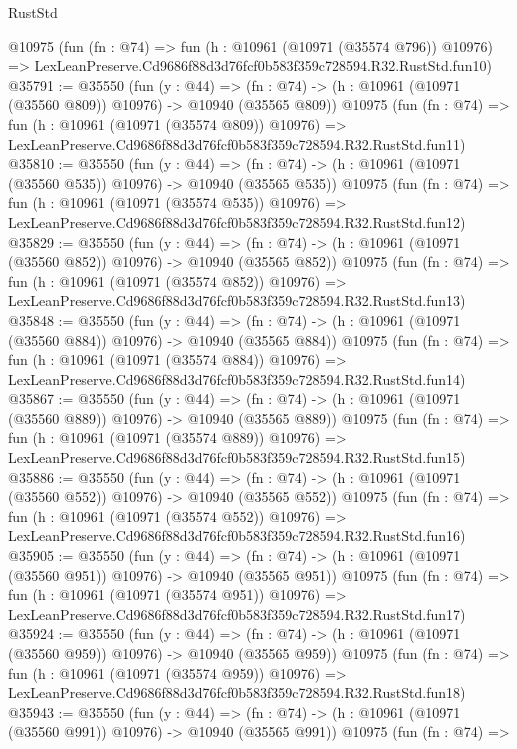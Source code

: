 \begin{lexlean}{RustStd}
\begin{coremodule}
    @10975
    (fun (fn : @74) =>
    fun (h : @10961 (@10971 (@35574 @796)) @10976) =>
    LexLeanPreserve.Cd9686f88d3d76fcf0b583f359c728594.R32.RustStd.fun10)
@35791 := @35550
    (fun (y : @44) =>
    (fn : @74) -> (h : @10961 (@10971 (@35560 @809)) @10976) -> @10940 (@35565 @809))
    @10975
    (fun (fn : @74) =>
    fun (h : @10961 (@10971 (@35574 @809)) @10976) =>
    LexLeanPreserve.Cd9686f88d3d76fcf0b583f359c728594.R32.RustStd.fun11)
@35810 := @35550
    (fun (y : @44) =>
    (fn : @74) -> (h : @10961 (@10971 (@35560 @535)) @10976) -> @10940 (@35565 @535))
    @10975
    (fun (fn : @74) =>
    fun (h : @10961 (@10971 (@35574 @535)) @10976) =>
    LexLeanPreserve.Cd9686f88d3d76fcf0b583f359c728594.R32.RustStd.fun12)
@35829 := @35550
    (fun (y : @44) =>
    (fn : @74) -> (h : @10961 (@10971 (@35560 @852)) @10976) -> @10940 (@35565 @852))
    @10975
    (fun (fn : @74) =>
    fun (h : @10961 (@10971 (@35574 @852)) @10976) =>
    LexLeanPreserve.Cd9686f88d3d76fcf0b583f359c728594.R32.RustStd.fun13)
@35848 := @35550
    (fun (y : @44) =>
    (fn : @74) -> (h : @10961 (@10971 (@35560 @884)) @10976) -> @10940 (@35565 @884))
    @10975
    (fun (fn : @74) =>
    fun (h : @10961 (@10971 (@35574 @884)) @10976) =>
    LexLeanPreserve.Cd9686f88d3d76fcf0b583f359c728594.R32.RustStd.fun14)
@35867 := @35550
    (fun (y : @44) =>
    (fn : @74) -> (h : @10961 (@10971 (@35560 @889)) @10976) -> @10940 (@35565 @889))
    @10975
    (fun (fn : @74) =>
    fun (h : @10961 (@10971 (@35574 @889)) @10976) =>
    LexLeanPreserve.Cd9686f88d3d76fcf0b583f359c728594.R32.RustStd.fun15)
@35886 := @35550
    (fun (y : @44) =>
    (fn : @74) -> (h : @10961 (@10971 (@35560 @552)) @10976) -> @10940 (@35565 @552))
    @10975
    (fun (fn : @74) =>
    fun (h : @10961 (@10971 (@35574 @552)) @10976) =>
    LexLeanPreserve.Cd9686f88d3d76fcf0b583f359c728594.R32.RustStd.fun16)
@35905 := @35550
    (fun (y : @44) =>
    (fn : @74) -> (h : @10961 (@10971 (@35560 @951)) @10976) -> @10940 (@35565 @951))
    @10975
    (fun (fn : @74) =>
    fun (h : @10961 (@10971 (@35574 @951)) @10976) =>
    LexLeanPreserve.Cd9686f88d3d76fcf0b583f359c728594.R32.RustStd.fun17)
@35924 := @35550
    (fun (y : @44) =>
    (fn : @74) -> (h : @10961 (@10971 (@35560 @959)) @10976) -> @10940 (@35565 @959))
    @10975
    (fun (fn : @74) =>
    fun (h : @10961 (@10971 (@35574 @959)) @10976) =>
    LexLeanPreserve.Cd9686f88d3d76fcf0b583f359c728594.R32.RustStd.fun18)
@35943 := @35550
    (fun (y : @44) =>
    (fn : @74) -> (h : @10961 (@10971 (@35560 @991)) @10976) -> @10940 (@35565 @991))
    @10975
    (fun (fn : @74) =>

\end{coremodule}
\end{lexlean}
